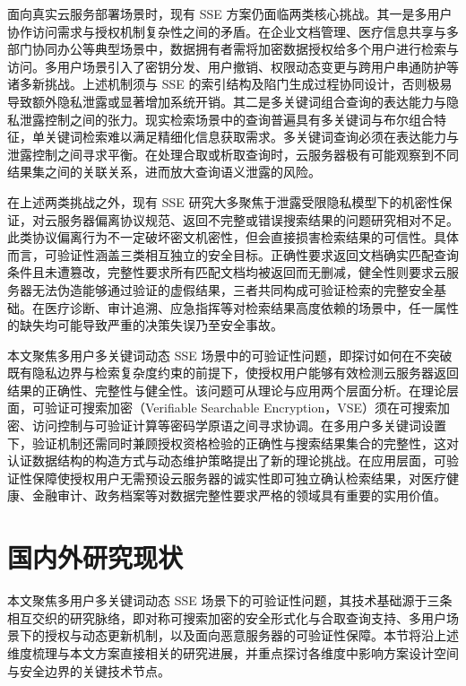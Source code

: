 面向真实云服务部署场景时，现有 SSE 方案仍面临两类核心挑战。其一是多用户协作访问需求与授权机制复杂性之间的矛盾。在企业文档管理、医疗信息共享与多部门协同办公等典型场景中，数据拥有者需将加密数据授权给多个用户进行检索与访问\cite{e98-b_1_190,10.1109/TPDS.2013.45,10.1109/ICDCS.2010.34,wang2012enabling}。多用户场景引入了密钥分发、用户撤销、权限动态变更与跨用户串通防护等诸多新挑战。上述机制须与 SSE 的索引结构及陷门生成过程协同设计，否则极易导致额外隐私泄露或显著增加系统开销。其二是多关键词组合查询的表达能力与隐私泄露控制之间的张力。现实检索场景中的查询普遍具有多关键词与布尔组合特征，单关键词检索难以满足精细化信息获取需求\cite{10.1145/2484313.2484322,6674958}。多关键词查询必须在表达能力与泄露控制之间寻求平衡。在处理合取或析取查询时，云服务器极有可能观察到不同结果集之间的关联关系，进而放大查询语义泄露的风险。

在上述两类挑战之外，现有 SSE 研究大多聚焦于泄露受限隐私模型下的机密性保证\cite{10.1145/2636328,10.1145/2810103.2813700,islam2012access,zhang2016all,patel2019mitigating,goldreich1996software}，对云服务器偏离协议规范、返回不完整或错误搜索结果的问题研究相对不足\cite{6364125,goldwasser2008delegating}。此类协议偏离行为不一定破坏密文机密性，但会直接损害检索结果的可信性。具体而言，可验证性涵盖三类相互独立的安全目标。正确性要求返回文档确实匹配查询条件且未遭篡改，完整性要求所有匹配文档均被返回而无删减，健全性则要求云服务器无法伪造能够通过验证的虚假结果，三者共同构成可验证检索的完整安全基础。在医疗诊断、审计追溯、应急指挥等对检索结果高度依赖的场景中，任一属性的缺失均可能导致严重的决策失误乃至安全事故。

本文聚焦多用户多关键词动态 SSE 场景中的可验证性问题，即探讨如何在不突破既有隐私边界与检索复杂度约束的前提下，使授权用户能够有效检测云服务器返回结果的正确性、完整性与健全性。该问题可从理论与应用两个层面分析。在理论层面，可验证可搜索加密（Verifiable Searchable Encryption，VSE）须在可搜索加密、访问控制与可验证计算等密码学原语之间寻求协调。在多用户多关键词设置下，验证机制还需同时兼顾授权资格检验的正确性与搜索结果集合的完整性，这对认证数据结构的构造方式与动态维护策略提出了新的理论挑战。在应用层面，可验证性保障使授权用户无需预设云服务器的诚实性即可独立确认检索结果，对医疗健康、金融审计、政务档案等对数据完整性要求严格的领域具有重要的实用价值。

\section{国内外研究现状}
本文聚焦多用户多关键词动态 SSE 场景下的可验证性问题，其技术基础源于三条相互交织的研究脉络，即对称可搜索加密的安全形式化与合取查询支持、多用户场景下的授权与动态更新机制，以及面向恶意服务器的可验证性保障。本节将沿上述维度梳理与本文方案直接相关的研究进展，并重点探讨各维度中影响方案设计空间与安全边界的关键技术节点。

